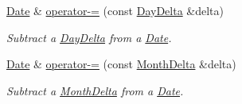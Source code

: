 \begin{DoxyCompactItemize}
\hyperlink{structDate}{Date} \& \hyperlink{structDate_a4fd0dac9dc8aeb5dbd008717c6bc8974}{operator-\/=} (const \hyperlink{structDayDelta}{Day\-Delta} \&delta)
\begin{DoxyCompactList}\small\item\em Subtract a \hyperlink{structDayDelta}{Day\-Delta} from a \hyperlink{structDate}{Date}. \end{DoxyCompactList}\item 
\hyperlink{structDate}{Date} \& \hyperlink{structDate_afe99434d7c9419d5505e9ba8ff599d05}{operator-\/=} (const \hyperlink{structMonthDelta}{Month\-Delta} \&delta)
\begin{DoxyCompactList}\small\item\em Subtract a \hyperlink{structMonthDelta}{Month\-Delta} from a \hyperlink{structDate}{Date}. \end{DoxyCompactList}\end{DoxyCompactItemize}
